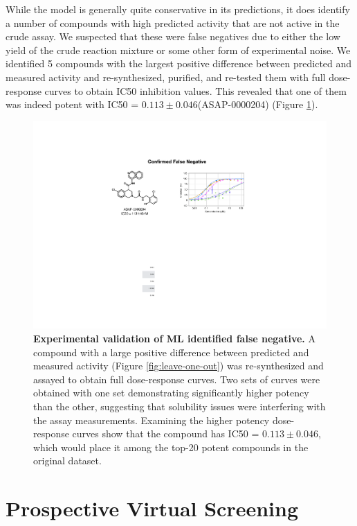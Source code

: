 While the model is generally quite conservative in its predictions, it does identify a number of compounds with high predicted activity that are not active in the crude assay. We suspected that these were false negatives due to either the low yield of the crude reaction mixture or some other form of experimental noise. We identified 5 compounds with the largest positive difference between predicted and measured activity and re-synthesized, purified, and re-tested them with full dose-response curves to obtain IC50 inhibition values. This revealed that one of them was indeed potent with IC50 = $0.113\pm0.046$\uM (ASAP-0000204) (Figure \ref{fig:false_negative}).


\begin{figure}
    \centering
    \includegraphics[width=\textwidth]{Chapters/Crude/Figs/false_negative.pdf}
    \caption{\textbf{Experimental validation of ML identified false negative.} A compound with a large positive difference between predicted and measured activity (Figure \ref{fig:leave-one-out}) was re-synthesized and assayed to obtain full dose-response curves. Two sets of curves were obtained with one set demonstrating significantly higher potency than the other, suggesting that solubility issues were interfering with the assay measurements. Examining the higher potency dose-response curves show that the compound has IC50 = $0.113\pm0.046$\uM, which would place it among the top-20 potent compounds in the original dataset.}
    \label{fig:false_negative}
\end{figure}

\section{Prospective Virtual Screening}

